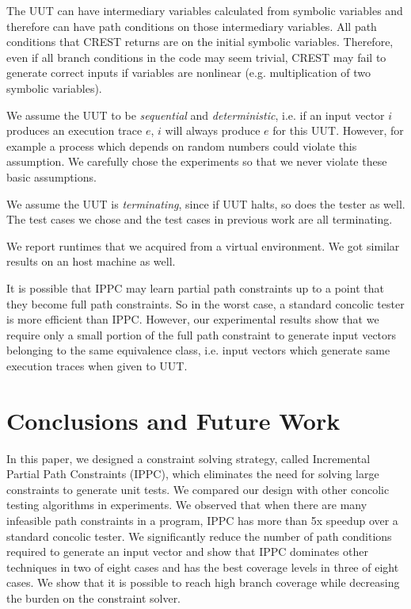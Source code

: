 \documentclass[EPiCempty]{easychair}
\begin{document}
The UUT can have intermediary variables calculated from symbolic variables and therefore can have path conditions on those intermediary variables. All path conditions that CREST returns are on the initial symbolic variables. Therefore, even if all branch conditions in the code may seem trivial, CREST may fail to generate correct inputs if variables are nonlinear (e.g. multiplication of two symbolic variables).

We assume the UUT to be \emph{sequential} and \emph{deterministic}, i.e. if an input vector $i$ produces an execution trace $e$, $i$ will always produce $e$ for this UUT. However, for example a process which depends on random numbers could violate this assumption. We carefully chose the experiments so that we never violate these basic assumptions.

We assume the UUT is \emph{terminating}, since if UUT halts, so does the tester as well. The test cases we chose and the test cases in previous work are all terminating.

We report runtimes that we acquired from a virtual environment. We got similar results on an host machine as well.

It is possible that IPPC may learn partial path constraints up to a point that they become full path constraints. So in the worst case, a standard concolic tester is more efficient than IPPC. However, our experimental results show that we require only a small portion of the full path constraint to generate input vectors belonging to the same equivalence class, i.e. input vectors which generate same execution traces when given to UUT.

\section{Conclusions and Future Work}
\label{sec:conclusions}

In this paper, we designed a constraint solving strategy, called Incremental Partial Path Constraints (IPPC), which eliminates the need for solving large constraints to generate unit tests. We compared our design with other concolic testing algorithms in experiments. We observed that when there are many infeasible path constraints in a program, IPPC has more than 5x speedup over a standard concolic tester. We significantly reduce the number of path conditions required to generate an input vector and show that IPPC dominates other techniques in two of eight cases and has the best coverage levels in three of eight cases. We show that it is possible to reach high branch coverage while decreasing the burden on the constraint solver. 
\end{document}
